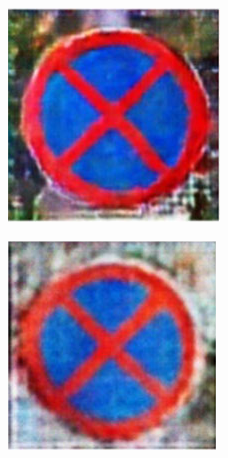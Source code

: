 \begin{figure}[h]
\begin{subfigure}{0.125\textwidth}
    \end{subfigure}
    \hspace{2em}%
    \begin{subfigure}{0.125\textwidth}
        \centering
        \includegraphics[height=\textwidth]{../images/Taiwan Schilder/Generated2.png}
    \end{subfigure}
    \hspace{2em}%
    \begin{subfigure}{0.125\textwidth}
     \centering
     \includegraphics[height=\textwidth]{../images/Taiwan Schilder/Generated3.png}
    \end{subfigure}


\end{figure}

